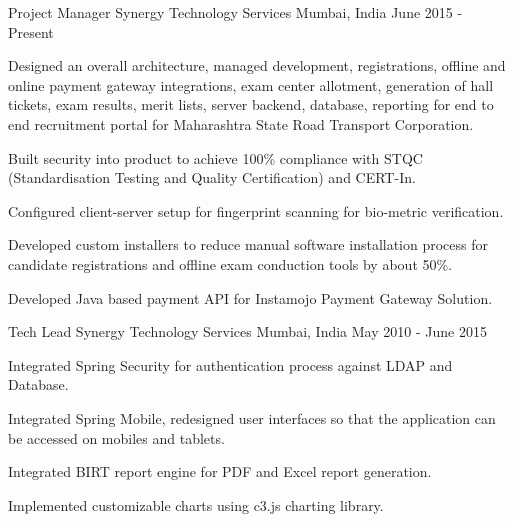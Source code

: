 

\begin{cventries}

  \cventry
    {Project Manager} %
    {Synergy Technology Services} %
    {Mumbai, India} %
    {June 2015 - Present} %
    {
      \begin{cvitems} %
        \item {Designed an overall architecture, managed development, registrations, offline and online payment gateway integrations, exam center allotment, generation of hall tickets, exam results, merit lists, server backend, database, reporting for end to end recruitment portal for Maharashtra State Road Transport Corporation.}
        \item {Built security into product to achieve 100\% compliance with STQC (Standardisation Testing and Quality Certification) and CERT-In.}
        \item {Configured client-server setup for fingerprint scanning for bio-metric verification.}
        \item {Developed custom installers to reduce manual software installation process for candidate registrations and offline exam conduction tools by about 50\%.}
        \item {Developed Java based payment API for Instamojo Payment Gateway Solution.}
      \end{cvitems}
    }

  \cventry
    {Tech Lead} %
    {Synergy Technology Services} %
    {Mumbai, India} %
    {May 2010 - June 2015} %
    {
      \begin{cvitems} %
        \item {Integrated Spring Security for authentication process against LDAP and Database.}
        \item {Integrated Spring Mobile, redesigned user interfaces so that the application can be accessed on mobiles and tablets.}
        \item {Integrated BIRT report engine for PDF and Excel report generation. }
        \item {Implemented customizable charts using c3.js charting library.}
      \end{cvitems}
    }


\end{cventries}
